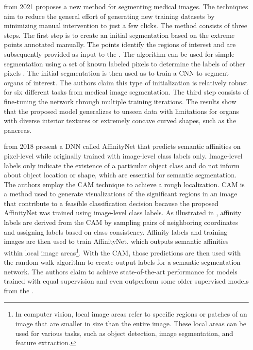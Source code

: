  \cite{make3020026} from 2021 proposes a new method for segmenting medical images. The techniques aim to reduce the general effort of generating new training datasets by minimizing manual intervention to just a few clicks. The method consists of three steps. The first step is to create an initial segmentation based on the extreme points annotated manually. The points identify the regions of interest and are subsequently provided as input to the . The algorithm can be used for simple segmentation using a set of known labeled pixels to determine the labels of other pixels \cite{grady2006random}. The initial segmentation is then used as  to train a \ac{CNN} to segment organs of interest. The authors claim this type of initialization is relatively robust for six different tasks from medical image segmentation. The third step consists of fine-tuning the network through multiple training iterations. The results show that the proposed model generalizes to unseen data with limitations for organs with diverse interior textures or extremely concave curved shapes, such as the pancreas.

 \cite{Ahn_2018_CVPR} from 2018 present a \ac{DNN} called AffinityNet that predicts semantic affinities on pixel-level while originally trained with image-level class labels only. Image-level labels only indicate the existence of a particular object class and do not inform about object location or shape, which are essential for semantic segmentation. The authors employ the \ac{CAM} technique \cite{zhou2016learning} to achieve a rough localization. \ac{CAM} is a method used to generate visualizations of the significant regions in an image that contribute to a feasible classification decision because the proposed AffinityNet was trained using image-level class labels. As illustrated in , affinity labels are derived from the \ac{CAM} by sampling pairs of neighboring coordinates and assigning labels based on class consistency. Affinity labels and training images are then used to train AffinityNet, which outputs semantic affinities within local image areas\footnote{In computer vision, local image areas refer to specific regions or patches of an image that are smaller in size than the entire image. These local areas can be used for various tasks, such as object detection, image segmentation, and feature extraction.}. With the \ac{CAM}, those predictions are then used with the random walk algorithm \cite{grady2006random} to create output labels for a semantic segmentation network. The authors claim to achieve state-of-the-art performance for models trained with equal supervision and even outperform some older supervised models from the \cite{long2015fully}.

